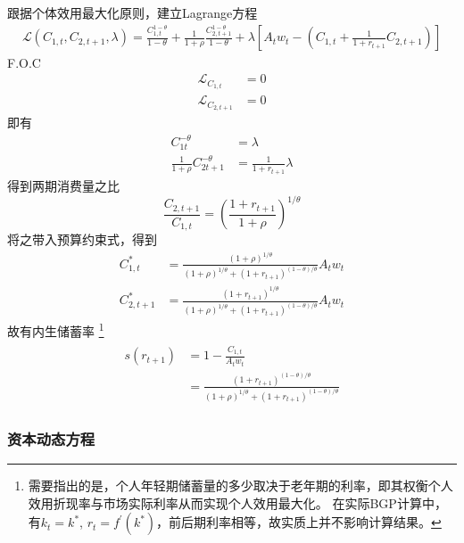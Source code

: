\documentclass[cn,normal,11pt,black]{elegantnote}
\begin{document}
跟据个体效用最大化原则，建立Lagrange方程
\begin{align}
    \mathcal{L}( C_{1,t}, C_{2,t+1}, \lambda) =
        \frac{C_{1,t}^{1-\theta}}{1-\theta}+\frac{1}{1+\rho} \frac{C_{2, t+1}^{1-\theta}}{1-\theta} + 
        \lambda\left[A_{t} w_{t}-\left(C_{1,t}+\frac{1}{1+r_{t+1}} C_{2,t+1}\right)\right]
\end{align}
F.O.C
\begin{align}
    \mathcal{L}_{C_{1,t}} & = 0 \\
    \mathcal{L}_{ C_{2,t+1}} & = 0
\end{align}
即有
\begin{align}
    C_{1 t}^{-\theta} & = \lambda \\ 
    \frac{1}{1+\rho} C_{2 t+1}^{-\theta} & = \frac{1}{1+r_{t+1}} \lambda
\end{align}
得到两期消费量之比
\begin{equation}
    \frac{C_{2,t+1}}{C_{1,t}} = \left( \frac{1+r_{t+1}}{1+\rho}\right)^{1/\theta}
\end{equation}
将之带入预算约束式，得到
\begin{align}
    C^*_{1,t} & = \frac{(1+\rho)^{1/\theta}}{(1+\rho)^{1/\theta} + (1+r_{t+1})^{(1-\theta)/\theta}} A_t w_t \\
    C^*_{2,t+1} & = \frac{(1+ r_{t+1})^{1/\theta}}{(1+\rho)^{1/\theta} + (1+r_{t+1})^{(1-\theta)/\theta}} A_t w_t 
\end{align}
故有内生储蓄率
\footnote{需要指出的是，个人年轻期储蓄量的多少取决于老年期的利率，即其权衡个人效用折现率与市场实际利率从而实现个人效用最大化。
          在实际BGP计算中，有$k_t = k^*$, $r_t = f^\prime(k^*)$，前后期利率相等，故实质上并不影响计算结果。}
\begin{align}\label{olgk}
\begin{aligned}
    s(r_{t+1}) & = 1 - \frac{C_{1,t}}{A_t w_t} \\
           & = \frac{(1+r_{t+1})^{(1-\theta)/\theta}}{(1+\rho)^{1/\theta} + (1+r_{t+1})^{(1-\theta)/\theta}}    
\end{aligned}
\end{align}

\subsubsection*{资本动态方程}
\end{document}
